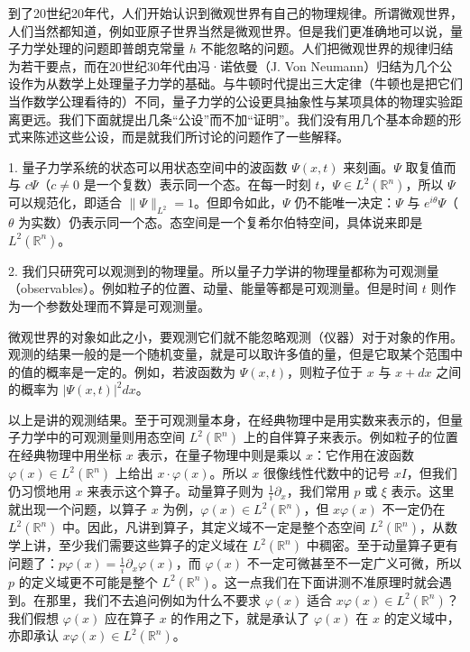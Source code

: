 到了20世纪20年代，人们开始认识到微观世界有自己的物理规律。所谓微观世界，人们当然都知道，例如亚原子世界当然是微观世界。但是我们更准确地可以说，量子力学处理的问题即普朗克常量 $h$ 不能忽略的问题。人们把微观世界的规律归结为若干要点，而在20世纪30年代由冯·诺依曼（J. Von Neumann）归结为几个公设作为从数学上处理量子力学的基础。与牛顿时代提出三大定律（牛顿也是把它们当作数学公理看待的）不同，量子力学的公设更具抽象性与某项具体的物理实验距离更远。我们下面就提出几条“公设”而不加“证明”。我们没有用几个基本命题的形式来陈述这些公设，而是就我们所讨论的问题作了一些解释。

1. 量子力学系统的状态可以用状态空间中的波函数 $\Psi(x,t)$ 来刻画。$\Psi$ 取复值而与 $c\Psi$（$c\ne0$ 是一个复数）表示同一个态。在每一时刻 $t$，$\Psi\in L^2(\mathbb R^n)$，所以 $\Psi$ 可以规范化，即适合 $\|\Psi\|_{L^2}=1$。但即令如此，$\Psi$ 仍不能唯一决定：$\Psi$ 与 $e^{i\theta}\Psi$（$\theta$ 为实数）仍表示同一个态。态空间是一个复希尔伯特空间，具体说来即是 $L^2(\mathbb R^n)$。

2. 我们只研究可以观测到的物理量。所以量子力学讲的物理量都称为可观测量（observables）。例如粒子的位置、动量、能量等都是可观测量。但是时间 $t$ 则作为一个参数处理而不算是可观测量。

微观世界的对象如此之小，要观测它们就不能忽略观测（仪器）对于对象的作用。观测的结果一般的是一个随机变量，就是可以取许多值的量，但是它取某个范围中的值的概率是一定的。例如，若波函数为 $\Psi(x,t)$，则粒子位于 $x$ 与 $x+dx$ 之间的概率为 $|\Psi(x,t)|^2dx$。

以上是讲的观测结果。至于可观测量本身，在经典物理中是用实数来表示的，但量子力学中的可观测量则用态空间 $L^2(\mathbb R^n)$ 上的自伴算子来表示。例如粒子的位置在经典物理中用坐标 $x$ 表示，在量子物理中则是乘以 $x$：它作用在波函数 $\varphi(x)\in L^2(\mathbb R^n)$ 上给出 $x\cdot\varphi(x)$。所以 $x$ 很像线性代数中的记号 $xI$，但我们仍习惯地用 $x$ 来表示这个算子。动量算子则为 $\frac1i\partial_x$，我们常用 $p$ 或 $\xi$ 表示。这里就出现一个问题，以算子 $x$ 为例，$\varphi(x)\in L^2(\mathbb R^n)$，但 $x\varphi(x)$ 不一定仍在 $L^2(\mathbb R^n)$ 中。因此，凡讲到算子，其定义域不一定是整个态空间 $L^2(\mathbb R^n)$，从数学上讲，至少我们需要这些算子的定义域在 $L^2(\mathbb R^n)$ 中稠密。至于动量算子更有问题了：$p\varphi(x)=\frac1i\partial_x\varphi(x)$，而 $\varphi(x)$ 不一定可微甚至不一定广义可微，所以 $p$ 的定义域更不可能是整个 $L^2(\mathbb R^n)$。这一点我们在下面讲测不准原理时就会遇到。在那里，我们不去追问例如为什么不要求 $\varphi(x)$ 适合 $x\varphi(x)\in L^2(\mathbb R^n)$？我们假想 $\varphi(x)$ 应在算子 $x$ 的作用之下，就是承认了 $\varphi(x)$ 在 $x$ 的定义域中，亦即承认 $x\varphi(x)\in L^2(\mathbb R^n)$。

